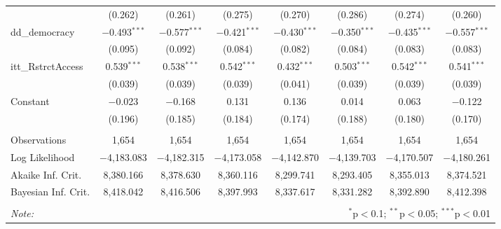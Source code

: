 \begin{sidewaystable}[!htbp]
\begin{tabular}{@{\extracolsep{5pt}}lccccccc}
  & (0.262) & (0.261) & (0.275) & (0.270) & (0.286) & (0.274) & (0.260) \\ 
  dd\_democracy & $-$0.493$^{***}$ & $-$0.577$^{***}$ & $-$0.421$^{***}$ & $-$0.430$^{***}$ & $-$0.350$^{***}$ & $-$0.435$^{***}$ & $-$0.557$^{***}$ \\ 
  & (0.095) & (0.092) & (0.084) & (0.082) & (0.084) & (0.083) & (0.083) \\ 
  itt\_RstrctAccess & 0.539$^{***}$ & 0.538$^{***}$ & 0.542$^{***}$ & 0.432$^{***}$ & 0.503$^{***}$ & 0.542$^{***}$ & 0.541$^{***}$ \\ 
  & (0.039) & (0.039) & (0.039) & (0.041) & (0.039) & (0.039) & (0.039) \\ 
  Constant & $-$0.023 & $-$0.168 & 0.131 & 0.136 & 0.014 & 0.063 & $-$0.122 \\ 
  & (0.196) & (0.185) & (0.184) & (0.174) & (0.188) & (0.180) & (0.170) \\ 
 \hline \\[-1.8ex] 
Observations & 1,654 & 1,654 & 1,654 & 1,654 & 1,654 & 1,654 & 1,654 \\ 
Log Likelihood & $-$4,183.083 & $-$4,182.315 & $-$4,173.058 & $-$4,142.870 & $-$4,139.703 & $-$4,170.507 & $-$4,180.261 \\ 
Akaike Inf. Crit. & 8,380.166 & 8,378.630 & 8,360.116 & 8,299.741 & 8,293.405 & 8,355.013 & 8,374.521 \\ 
Bayesian Inf. Crit. & 8,418.042 & 8,416.506 & 8,397.993 & 8,337.617 & 8,331.282 & 8,392.890 & 8,412.398 \\ 
\hline 
\hline \\[-1.8ex] 
\textit{Note:}  & \multicolumn{7}{r}{$^{*}$p$<$0.1; $^{**}$p$<$0.05; $^{***}$p$<$0.01} \\ 
\end{tabular} 
\end{sidewaystable} 
